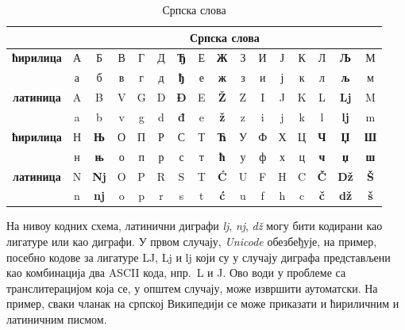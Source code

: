 \begin{multicols}{2}
\begin{table}[ht]
\begin{center}
\renewcommand{\arraystretch}{1.5}
\setlength{\arrayrulewidth}{1pt}
\begin{tabular}{|c|c|c|c|c|c|c|c|c|c|c|c|c|c|c|c|}
\cline{2-16}
\multicolumn{1}{c}{} & \multicolumn{15}{|c|}{{\textbf{Српска слова}}} \\
\hline
{\textbf{ћирилица}} & А & Б & В & Г & Д & \textbf{Ђ} & Е & \textbf{Ж} & З & И & Ј & К & Л & \textbf{Љ} & М \\ 
         & а & б & в & г & д & \textbf{ђ} & е & \textbf{ж} & з & и & ј & к & л & \textbf{љ} & м \\
\hline
{\textbf{латиница}} & A & B & V & G & D & \cellcolor{grey3}\textbf{Đ} & E & \cellcolor{grey3}\textbf{Ž} & Z & I & J & K & L & \cellcolor{grey2} \textbf{Lj} & M \\
         & a & b & v & g & d & \cellcolor{grey3} \textbf{đ} & e & \cellcolor{grey3}\textbf{ž} & z & i & j & k & l & \cellcolor{grey2} \textbf{lj} & m \\
\hline
{\textbf{ћирилица}} & Н & \textbf{Њ} & О & П & Р & С & Т & \textbf{Ћ} & У & Ф & Х & Ц & \textbf{Ч} & \textbf{Џ} & \textbf{Ш} \\
        & н & \textbf{њ} & о & п & р & с & т & \textbf{ћ} & у & ф & х & ц & \textbf{ч} & \textbf{џ} &  \textbf{ш} \\
\hline
{\textbf{латиница}} & N & \cellcolor{grey2} \textbf{Nj} & O & P & R & S & T & \cellcolor{grey3} \textbf{Ć} & U & F & H & C & \cellcolor{grey3} \textbf{Č} & \cellcolor{grey2} \textbf{Dž} & \cellcolor{grey3} \textbf{Š} \\
         & n & \cellcolor{grey2} \textbf{nj} & o & p & r & s & t & \cellcolor{grey3} \textbf{ć} & u & f & h & c & \cellcolor{grey3} \textbf{č} & \cellcolor{grey2} \textbf{dž} & \cellcolor{grey3} \textbf{š} \\
\hline
\end{tabular}
\end{center}
\caption{Српска слова}
 \label{azbuka}
\end{table}

На нивоу кодних схема, латинични диграфи \textit{lj}, \textit{nj}, \textit{dž} могу бити кодирани као лигатуре или као диграфи. У првом случају, \textit{Unicode} \cite{UNICODE} обезбеђује, на пример, посебно кодове за лигатуре LJ, Lj и lj који су у случају диграфа представљени као комбинација два ASCII кода,  нпр.~L и J. Ово води у проблеме са транслитерацијом  која се, у општем случају, може извршити аутоматски. На пример, сваки чланак на српској Википедији се може приказати и ћириличним и латиничним писмом. 


\end{multicols}
